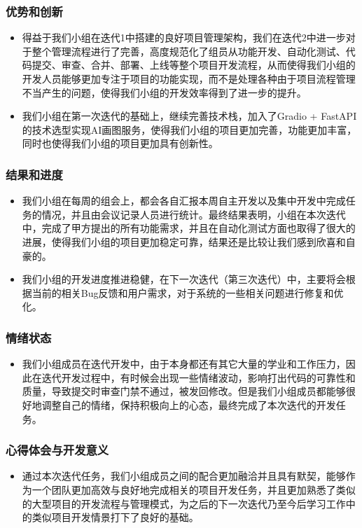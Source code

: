 \begin{frame}
    \frametitle{优势和创新}
    \begin{itemize}
        \item 得益于我们小组在迭代1中搭建的良好项目管理架构，我们在迭代2中进一步对于整个管理流程进行了完善，高度规范化了组员从功能开发、自动化测试、代码提交、审查、合并、部署、上线等整个项目开发流程，从而使得我们小组的开发人员能够更加专注于项目的功能实现，而不是处理各种由于项目流程管理不当产生的问题，使得我们小组的开发效率得到了进一步的提升。
        \item 我们小组在第一次迭代的基础上，继续完善技术栈，加入了Gradio + FastAPI的技术选型实现AI画图服务，使得我们小组的项目更加完善，功能更加丰富，同时也使得我们小组的项目更加具有创新性。
    \end{itemize}
\end{frame}

\begin{frame}
    \frametitle{结果和进度}
    \begin{itemize}
        \item 我们小组在每周的组会上，都会各自汇报本周自主开发以及集中开发中完成任务的情况，并且由会议记录人员进行统计。最终结果表明，小组在本次迭代中，完成了甲方提出的所有功能需求，并且在自动化测试方面也取得了很大的进展，使得我们小组的项目更加稳定可靠，结果还是比较让我们感到欣喜和自豪的。
        \item 我们小组的开发进度推进稳健，在下一次迭代（第三次迭代）中，主要将会根据当前的相关Bug反馈和用户需求，对于系统的一些相关问题进行修复和优化。
    \end{itemize}
\end{frame}

\begin{frame}
    \frametitle{情绪状态}
    \begin{itemize}
        \item 我们小组成员在迭代开发中，由于本身都还有其它大量的学业和工作压力，因此在迭代开发过程中，有时候会出现一些情绪波动，影响打出代码的可靠性和质量，导致提交时审查门禁不通过，被发回修改。但是我们小组成员都能够很好地调整自己的情绪，保持积极向上的心态，最终完成了本次迭代的开发任务。
    \end{itemize}
\end{frame}

\begin{frame}
    \frametitle{心得体会与开发意义}
    \begin{itemize}
        \item 通过本次迭代任务，我们小组成员之间的配合更加融洽并且具有默契，能够作为一个团队更加高效与良好地完成相关的项目开发任务，并且更加熟悉了类似的大型项目的开发流程与管理模式，为之后的下一次迭代乃至今后学习工作中的类似项目开发情景打下了良好的基础。
    \end{itemize}
\end{frame}